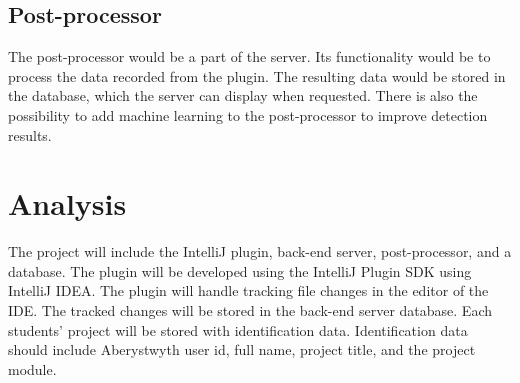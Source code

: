 \subsection{Post-processor}
The post-processor would be a part of the server. Its functionality would be to process the data recorded from the plugin. The resulting data would be stored in the database, which the server can display when requested. There is also the possibility to add machine learning to the post-processor to improve detection results.

\section{Analysis}
\label{sec:analysis}
The project will include the IntelliJ plugin, back-end server, post-processor, and a database. The plugin will be developed using the IntelliJ Plugin SDK using IntelliJ IDEA. The plugin will handle tracking file changes in the editor of the IDE. The tracked changes will be stored in the back-end server database. Each students' project will be stored with identification data. Identification data should include Aberystwyth user id, full name, project title, and the project module.

